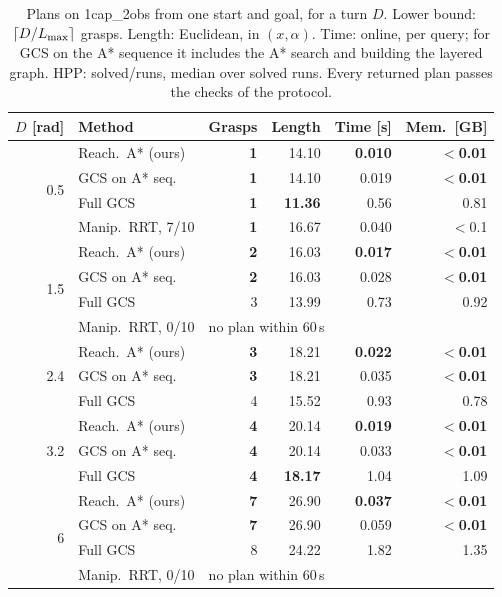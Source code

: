 \begin{table}[t]
\centering
\caption{Plans on \textsf{1cap\_2obs} from one start and goal, for a turn $D$.
Lower bound: $\lceil D/L_{\max}\rceil$ grasps. Length: Euclidean, in
$(x,\alpha)$. Time: online, per query; for GCS on the A* sequence it
includes the A* search and building the layered graph. HPP: solved/runs,
median over solved runs. Every returned plan passes the checks of the
protocol.}
\label{tab:gcs}
\setlength{\tabcolsep}{3.2pt}
\begin{tabular}{@{}r l r r r r@{}}
\toprule
$D$ [rad] & Method & Grasps & Length & Time [s] & Mem.\ [GB]\\
\midrule
\multirow{4}{*}{0.5} & Reach.\ A* (ours) & \textbf{1} & 14.10 & \textbf{0.010} & \textbf{$<$0.01}\\
 & GCS on A* seq. & \textbf{1} & 14.10 & 0.019 & \textbf{$<$0.01}\\
 & Full GCS & \textbf{1} & \textbf{11.36} & 0.56 & 0.81\\
 & Manip.\ RRT, 7/10 & \textbf{1} & 16.67 & 0.040 & $<$0.1\\
\midrule
\multirow{4}{*}{1.5} & Reach.\ A* (ours) & \textbf{2} & 16.03 & \textbf{0.017} & \textbf{$<$0.01}\\
 & GCS on A* seq. & \textbf{2} & 16.03 & 0.028 & \textbf{$<$0.01}\\
 & Full GCS & 3 & 13.99 & 0.73 & 0.92\\
 & Manip.\ RRT, 0/10 & \multicolumn{4}{l}{no plan within 60\,s}\\
\midrule
\multirow{3}{*}{2.4} & Reach.\ A* (ours) & \textbf{3} & 18.21 & \textbf{0.022} & \textbf{$<$0.01}\\
 & GCS on A* seq. & \textbf{3} & 18.21 & 0.035 & \textbf{$<$0.01}\\
 & Full GCS & 4 & 15.52 & 0.93 & 0.78\\
\midrule
\multirow{3}{*}{3.2} & Reach.\ A* (ours) & \textbf{4} & 20.14 & \textbf{0.019} & \textbf{$<$0.01}\\
 & GCS on A* seq. & \textbf{4} & 20.14 & 0.033 & \textbf{$<$0.01}\\
 & Full GCS & \textbf{4} & \textbf{18.17} & 1.04 & 1.09\\
\midrule
\multirow{4}{*}{6} & Reach.\ A* (ours) & \textbf{7} & 26.90 & \textbf{0.037} & \textbf{$<$0.01}\\
 & GCS on A* seq. & \textbf{7} & 26.90 & 0.059 & \textbf{$<$0.01}\\
 & Full GCS & 8 & 24.22 & 1.82 & 1.35\\
 & Manip.\ RRT, 0/10 & \multicolumn{4}{l}{no plan within 60\,s}\\
\bottomrule
\end{tabular}
\end{table}

